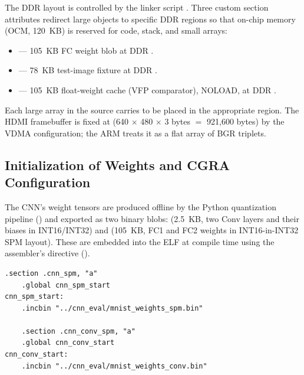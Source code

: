 The DDR layout is controlled by the linker script .
Three custom section attributes redirect large objects to specific DDR
regions so that on-chip memory (OCM, 120~KB) is reserved for code,
stack, and small  arrays:

\begin{itemize}[leftmargin=1.4cm,itemsep=2pt,topsep=2pt]
\item {} --- 105~KB FC weight blob at DDR .
\item {} --- 78~KB test-image fixture at DDR .
\item {} --- 105~KB float-weight cache (VFP comparator),
NOLOAD, at DDR .
\end{itemize}

Each large array in the source carries
 to be placed in the appropriate
region. The HDMI framebuffer is fixed at 
(640 $\times$ 480 $\times$ 3 bytes $=$ 921{,}600 bytes) by the VDMA
configuration; the ARM treats it as a flat array of BGR triplets.

\subsection{Initialization of Weights and CGRA Configuration}
\label{ssec:weights}

The CNN's weight tensors are produced offline by the Python
quantization pipeline () and
exported as two binary blobs:  (2.5~KB,
two Conv layers and their biases in INT16/INT32) and
 (105~KB, FC1 and FC2 weights in
INT16-in-INT32 SPM layout). These are embedded into the ELF at
compile time using the assembler's  directive
().

\begin{lstlisting}[language={[x86masm]Assembler},caption={Weight-blob
embedding via the \code{.incbin} directive. The linker places these
sections at fixed DDR addresses.},label={lst:incbin}]
    .section .cnn_spm, "a"
    .global cnn_spm_start
cnn_spm_start:
    .incbin "../cnn_eval/mnist_weights_spm.bin"

    .section .cnn_conv_spm, "a"
    .global cnn_conv_start
cnn_conv_start:
    .incbin "../cnn_eval/mnist_weights_conv.bin"
\end{lstlisting}

